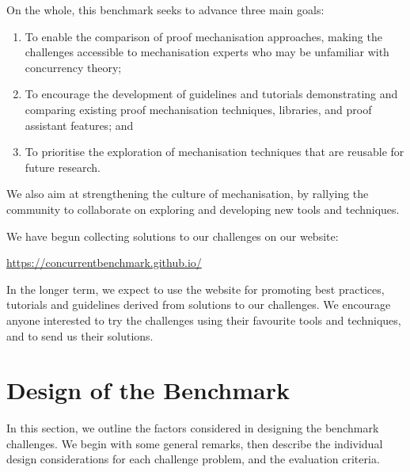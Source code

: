 \documentclass[runningheads]{llncs}
\begin{document}
On the whole, this benchmark seeks to advance three main goals:

\begin{enumerate}[label=\textbf{(G\arabic*)},leftmargin=10mm]
\item\label{item:goal-comperison-accessibility} To enable the comparison of
  proof mechanisation approaches, making the challenges accessible to
  mechanisation experts who may be unfamiliar with concurrency theory;

\item\label{item:goal-tutorials} To encourage the development of guidelines and
  tutorials demonstrating and comparing existing proof mechanisation
  techniques, libraries, and proof assistant features; and

\item\label{item:goal-reusability} To prioritise the exploration of mechanisation
  techniques that are reusable for future research.
\end{enumerate}
We also aim at strengthening the culture of mechanisation, by rallying the
community to collaborate on exploring and developing new tools and techniques.

We have begun collecting solutions to our challenges on our website:
%
\begin{center}
  \url{https://concurrentbenchmark.github.io/}
\end{center}
%
In the longer term, we expect to use the website for promoting best practices,
tutorials and guidelines derived from solutions to our challenges.
We encourage anyone interested to try the challenges using their
favourite tools and techniques, and to send us their solutions.

\section{Design of the Benchmark}\label{sec:design-discussion}

In this section, we outline the factors considered in designing the
benchmark challenges. We begin with some general remarks, then
describe the individual design considerations for each challenge problem,
and the evaluation criteria.
\end{document}
